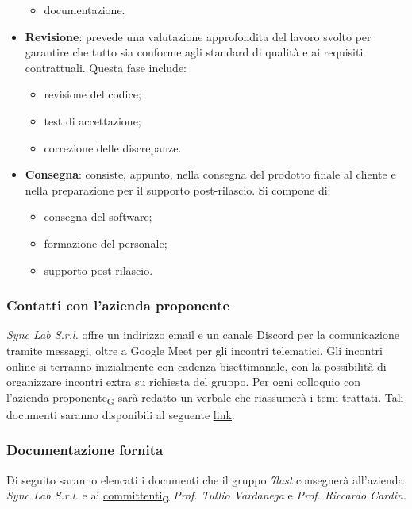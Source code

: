 \begin{itemize}
\begin{itemize}
		      \item documentazione.
	      \end{itemize}
	\item \textbf{Revisione}: prevede una valutazione approfondita del lavoro svolto per garantire che tutto sia conforme agli standard di qualità e ai requisiti contrattuali. Questa fase include:
	      \begin{itemize}
		      \item revisione del codice;
		      \item test di accettazione;
		      \item correzione delle discrepanze.
	      \end{itemize}
	\item \textbf{Consegna}: consiste, appunto, nella consegna del prodotto finale al cliente e nella preparazione per il supporto post-rilascio. Si compone di:
	      \begin{itemize}
		      \item consegna del software;
		      \item formazione del personale;
		      \item supporto post-rilascio.
	      \end{itemize}
\end{itemize}

\subsubsection{Contatti con l'azienda proponente}
\textit{Sync Lab S.r.l.} offre un indirizzo email e un canale Discord per la comunicazione tramite messaggi, oltre a Google Meet per gli incontri telematici. Gli incontri online si terranno inizialmente con cadenza bisettimanale, con la possibilità di organizzare incontri extra su richiesta del gruppo. Per ogni colloquio con l’azienda \href{https://7last.github.io/docs/rtb/documentazione-interna/glossario\#proponente}{proponente\textsubscript{G}} sarà redatto un verbale che riassumerà i temi trattati. Tali documenti saranno disponibili al seguente \href{https://7last.github.io/docs/category/verbali-esterni}{\underline{link}}.

\subsubsection{Documentazione fornita}
Di seguito saranno elencati i documenti che il gruppo \textit{7last} consegnerà all'azienda \textit{Sync Lab S.r.l.} e ai \href{https://7last.github.io/docs/rtb/documentazione-interna/glossario\#committente}{committenti\textsubscript{G}} \textit{Prof. Tullio Vardanega} e \textit{Prof. Riccardo Cardin}.
\newpage

